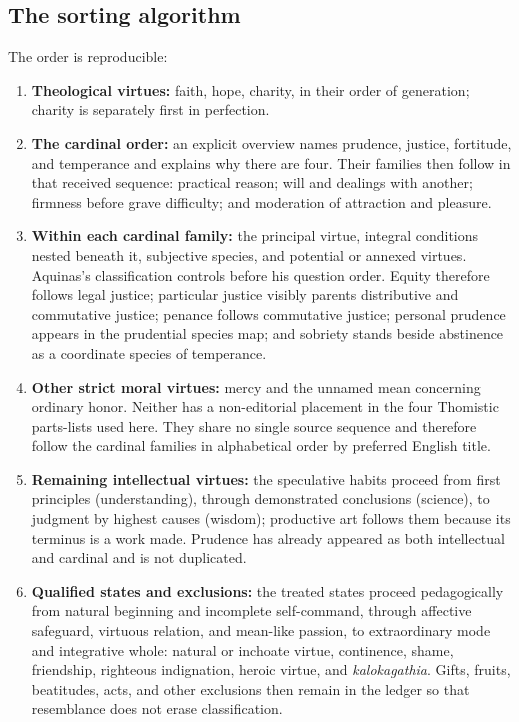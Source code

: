 {\subsection{The sorting algorithm}

The order is reproducible:

\begin{enumerate}[leftmargin=1.55em,itemsep=0.25em]
  \item \textbf{Theological virtues:} faith, hope, charity, in their order of generation; charity is separately first in perfection.
  \item \textbf{The cardinal order:} an explicit overview names prudence, justice, fortitude, and temperance and explains why there are four. Their families then follow in that received sequence: practical reason; will and dealings with another; firmness before grave difficulty; and moderation of attraction and pleasure.
  \item \textbf{Within each cardinal family:} the principal virtue, integral conditions nested beneath it, subjective species, and potential or annexed virtues. Aquinas's classification controls before his question order. Equity therefore follows legal justice; particular justice visibly parents distributive and commutative justice; penance follows commutative justice; personal prudence appears in the prudential species map; and sobriety stands beside abstinence as a coordinate species of temperance.
  \item \textbf{Other strict moral virtues:} mercy and the unnamed mean concerning ordinary honor. Neither has a non-editorial placement in the four Thomistic parts-lists used here. They share no single source sequence and therefore follow the cardinal families in alphabetical order by preferred English title.
  \item \textbf{Remaining intellectual virtues:} the speculative habits proceed from first principles (understanding), through demonstrated conclusions (science), to judgment by highest causes (wisdom); productive art follows them because its terminus is a work made. Prudence has already appeared as both intellectual and cardinal and is not duplicated.
  \item \textbf{Qualified states and exclusions:} the treated states proceed pedagogically from natural beginning and incomplete self-command, through affective safeguard, virtuous relation, and mean-like passion, to extraordinary mode and integrative whole: natural or inchoate virtue, continence, shame, friendship, righteous indignation, heroic virtue, and \emph{kalokagathia}. Gifts, fruits, beatitudes, acts, and other exclusions then remain in the ledger so that resemblance does not erase classification.
\end{enumerate}

}

